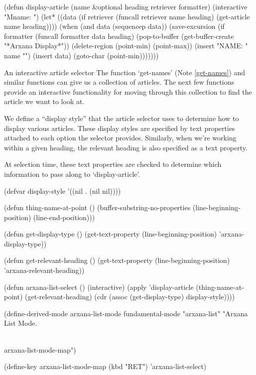 \begin{elisp}
(defun display-article
  (name &optional heading retriever formatter)
  (interactive "Mname: ")
  (let* ((data (if retriever
                   (funcall retriever name heading)
                 (get-article name heading))))
    (when (and data (sequencep data))
      (save-excursion
        (if formatter
            (funcall formatter data heading)
          (pop-to-buffer (get-buffer-create
                          "*Arxana Display*"))
          (delete-region (point-min) (point-max))
          (insert "NAME: " name "\n\n")
          (insert data)
          (goto-char (point-min)))))))
\end{elisp}

\begin{notate}{An interactive article selector} \label{selector}
The function `get-names' (Note \ref{get-names}) and
similar functions can give us a collection of articles.
The next few functions provide an interactive
functionality for moving through this collection to find
the article we want to look at.

We define a ``display style'' that the article selector
uses to determine how to display various articles.  These
display styles are specified by text properties attached
to each option the selector provides.  Similarly, when
we're working within a given heading, the relevant heading
is also specified as a text property.

At selection time, these text properties are checked to
determine which information to pass along to
`display-article'.
\end{notate}

\begin{elisp}
(defvar display-style '((nil . (nil nil))))

(defun thing-name-at-point ()
  (buffer-substring-no-properties
   (line-beginning-position)
   (line-end-position)))

(defun get-display-type ()
  (get-text-property (line-beginning-position)
                     'arxana-display-type))

(defun get-relevant-heading ()
  (get-text-property (line-beginning-position)
                     'arxana-relevant-heading))

(defun arxana-list-select ()
  (interactive)
  (apply 'display-article
         (thing-name-at-point)
         (get-relevant-heading)
         (cdr (assoc (get-display-type)
                     display-style))))

(define-derived-mode arxana-list-mode fundamental-mode
  "arxana-list" "Arxana List Mode.

\\{arxana-list-mode-map}")

(define-key arxana-list-mode-map (kbd "RET")
            'arxana-list-select)
\end{elisp}

